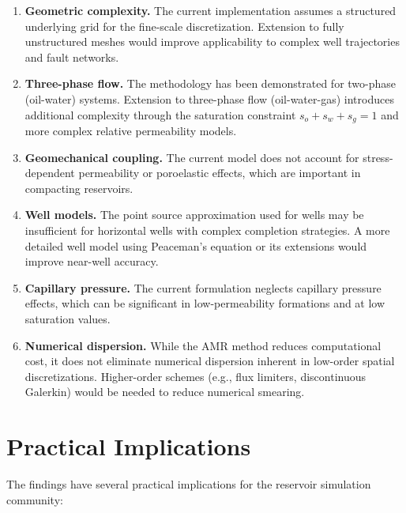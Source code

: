 \begin{enumerate}
    \item \textbf{Geometric complexity.} The current implementation assumes a structured underlying grid for the fine-scale discretization. Extension to fully unstructured meshes would improve applicability to complex well trajectories and fault networks.

    \item \textbf{Three-phase flow.} The methodology has been demonstrated for two-phase (oil-water) systems. Extension to three-phase flow (oil-water-gas) introduces additional complexity through the saturation constraint $s_o + s_w + s_g = 1$ and more complex relative permeability models.

    \item \textbf{Geomechanical coupling.} The current model does not account for stress-dependent permeability or poroelastic effects, which are important in compacting reservoirs.

    \item \textbf{Well models.} The point source approximation used for wells may be insufficient for horizontal wells with complex completion strategies. A more detailed well model using Peaceman's equation or its extensions would improve near-well accuracy.

    \item \textbf{Capillary pressure.} The current formulation neglects capillary pressure effects, which can be significant in low-permeability formations and at low saturation values.

    \item \textbf{Numerical dispersion.} While the AMR method reduces computational cost, it does not eliminate numerical dispersion inherent in low-order spatial discretizations. Higher-order schemes (e.g., flux limiters, discontinuous Galerkin) would be needed to reduce numerical smearing.
\end{enumerate}

\section{Practical Implications}
\label{sec:discussion:implications}

The findings have several practical implications for the reservoir simulation community:

